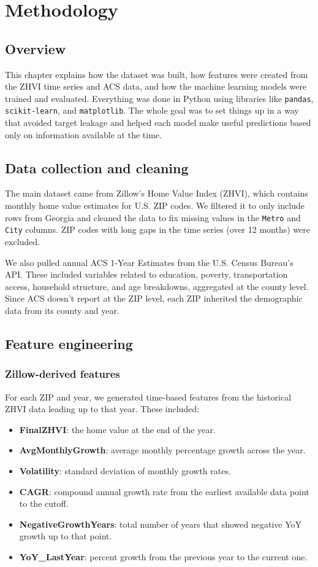 \chapter{Methodology}
\label{ch:method}

\section{Overview}
This chapter explains how the dataset was built, how features were created from the ZHVI time series and ACS data, and how the machine learning models were trained and evaluated. Everything was done in Python using libraries like \texttt{pandas}, \texttt{scikit-learn}, and \texttt{matplotlib}. The whole goal was to set things up in a way that avoided target leakage and helped each model make useful predictions based only on information available at the time.

\section{Data collection and cleaning}
The main dataset came from Zillow’s Home Value Index (ZHVI), which contains monthly home value estimates for U.S. ZIP codes. We filtered it to only include rows from Georgia and cleaned the data to fix missing values in the \texttt{Metro} and \texttt{City} columns. ZIP codes with long gaps in the time series (over 12 months) were excluded.

We also pulled annual ACS 1-Year Estimates from the U.S. Census Bureau’s API. These included variables related to education, poverty, transportation access, household structure, and age breakdowns, aggregated at the county level. Since ACS doesn’t report at the ZIP level, each ZIP inherited the demographic data from its county and year.

\section{Feature engineering}
\subsection{Zillow-derived features}
For each ZIP and year, we generated time-based features from the historical ZHVI data leading up to that year. These included:
\begin{itemize}
    \item \textbf{FinalZHVI}: the home value at the end of the year.
    \item \textbf{AvgMonthlyGrowth}: average monthly percentage growth across the year.
    \item \textbf{Volatility}: standard deviation of monthly growth rates.
    \item \textbf{CAGR}: compound annual growth rate from the earliest available data point to the cutoff.
    \item \textbf{NegativeGrowthYears}: total number of years that showed negative YoY growth up to that point.
    \item \textbf{YoY\_LastYear}: percent growth from the previous year to the current one.
\end{itemize}

